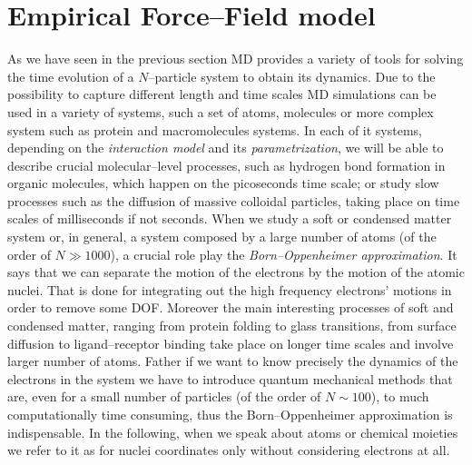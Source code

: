 \section{Empirical Force--Field model}
As we have seen in the previous section \ac{MD} provides a variety of tools for solving the time evolution of a $N$--particle system to obtain its dynamics. Due to the possibility to capture different length and time scales \ac{MD} simulations can be used in a variety of systems, such a set of atoms, molecules or more complex system such as protein and macromolecules systems. In each of it systems, depending on the \textit{interaction model} and its \textit{parametrization}, we will be able to describe crucial molecular--level processes, such as hydrogen bond formation in organic molecules, which happen on the picoseconds time scale; or study slow processes such as the diffusion of massive colloidal particles, taking place on time scales of milliseconds if not seconds. When we study a soft or condensed matter system or, in general, a system composed by a large number of atoms (of the order of $N \gg 1000$), a crucial role play the \textit{Born--Oppenheimer approximation}. It says that we can separate the motion of the electrons by the motion of the atomic nuclei. That is done for integrating out the high frequency electrons' motions in order to remove some \ac{DOF}. Moreover the main interesting processes of soft and condensed matter, ranging from protein folding to glass transitions, from surface diffusion to ligand--receptor binding take place on longer time scales and involve larger number of atoms. Father if we want to know precisely the dynamics of the electrons in the system we have to introduce quantum mechanical methods that are, even for a small number of particles (of the order of $N\sim 100$), to much computationally time consuming, thus the Born--Oppenheimer approximation is indispensable. In the following, when we speak about atoms or chemical moieties we refer to it as for nuclei coordinates only without considering electrons at all.

